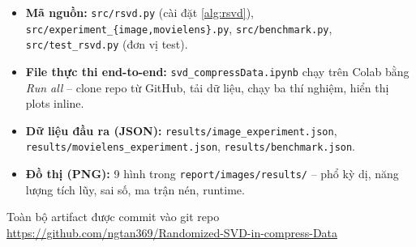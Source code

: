 \begin{itemize}
    \item \textbf{Mã nguồn:} \texttt{src/rsvd.py} (cài đặt \cref{alg:rsvd}),
    \texttt{src/experiment\_\{image,movielens\}.py}, \texttt{src/benchmark.py},
    \texttt{src/test\_rsvd.py} (đơn vị test).
    \item \textbf{File thực thi end-to-end:} \texttt{svd\_compressData.ipynb}
    chạy trên Colab bằng \emph{Run all} -- clone repo từ GitHub, tải dữ liệu,
    chạy ba thí nghiệm, hiển thị plots inline.
    \item \textbf{Dữ liệu đầu ra (JSON):} \texttt{results/image\_experiment.json},
    \texttt{results/movielens\_experiment.json},
    \texttt{results/benchmark.json}.
    \item \textbf{Đồ thị (PNG):} 9 hình trong \texttt{report/images/results/}
    -- phổ kỳ dị, năng lượng tích lũy, sai số, ma trận nén, runtime.
\end{itemize}

Toàn bộ artifact được commit vào git repo
\url{https://github.com/ngtan369/Randomized-SVD-in-compress-Data}